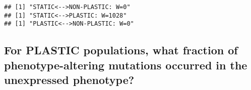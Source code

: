 \documentclass[]{book}
\newenvironment{Shaded}{\begin{snugshade}}{\end{snugshade}}
\newcommand{\ControlFlowTok}[1]{\textcolor[rgb]{0.13,0.29,0.53}{\textbf{#1}}}
\newcommand{\DataTypeTok}[1]{\textcolor[rgb]{0.13,0.29,0.53}{#1}}
\newcommand{\DecValTok}[1]{\textcolor[rgb]{0.00,0.00,0.81}{#1}}
\newcommand{\KeywordTok}[1]{\textcolor[rgb]{0.13,0.29,0.53}{\textbf{#1}}}
\newcommand{\NormalTok}[1]{#1}
\newcommand{\OperatorTok}[1]{\textcolor[rgb]{0.81,0.36,0.00}{\textbf{#1}}}
\newcommand{\OtherTok}[1]{\textcolor[rgb]{0.56,0.35,0.01}{#1}}
\newcommand{\StringTok}[1]{\textcolor[rgb]{0.31,0.60,0.02}{#1}}
\begin{document}
\begin{Shaded}
\end{Shaded}

\begin{verbatim}
## [1] "STATIC<-->NON-PLASTIC: W=0"
## [1] "STATIC<-->PLASTIC: W=1028"
## [1] "PLASTIC<-->NON-PLASTIC: W=0"
\end{verbatim}

\hypertarget{for-plastic-populations-what-fraction-of-phenotype-altering-mutations-occurred-in-the-unexpressed-phenotype}{%
\subsection{For PLASTIC populations, what fraction of phenotype-altering mutations occurred in the unexpressed phenotype?}\label{for-plastic-populations-what-fraction-of-phenotype-altering-mutations-occurred-in-the-unexpressed-phenotype}}
\end{document}
